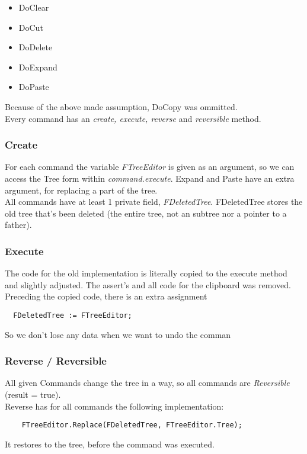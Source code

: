 \documentclass[]{article}
\begin{document}
\begin{itemize}
  \item DoClear
  \item DoCut
  \item DoDelete
  \item DoExpand
  \item DoPaste
\end{itemize}

Because of the above made assumption, DoCopy was ommitted. \\
Every command has an \emph{create, execute, reverse} and \emph{reversible} method.
\subsubsection{Create} %
\label{ssub:create}
 For each command the variable \emph{FTreeEditor} is given as an argument, so we can access the Tree form within \emph{command.execute}. Expand and Paste have an extra argument, for replacing a part of the tree.\\
 All commands have at least 1 private field, \emph{FDeletedTree}. FDeletedTree stores the old tree that's been deleted (the entire tree, not an subtree nor a pointer to a father). 
 

\subsubsection{Execute} %
\label{ssub:execute}
The code for the old implementation is literally copied to the execute method and slightly adjusted. The assert's and all code for the clipboard was removed.\\

Preceding the copied code, there is an extra assignment 
\begin{verbatim}
  FDeletedTree := FTreeEditor;
\end{verbatim}
  So we don't lose any data when we want to undo the comman


\subsubsection{Reverse / Reversible} %
\label{ssub:reverse_reversible}

All given Commands change the tree in a way, so all commands are \emph{Reversible} (result = true).\\
Reverse has for all commands the following implementation:
\begin{verbatim}
    FTreeEditor.Replace(FDeletedTree, FTreeEditor.Tree);
\end{verbatim}
It restores to the tree, before the command was executed.
\end{document}
